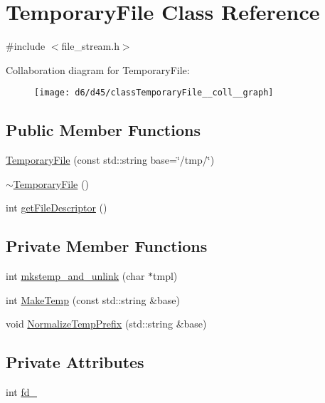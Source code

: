 \hypertarget{classTemporaryFile}{}\section{Temporary\+File Class Reference}
\label{classTemporaryFile}


{\ttfamily \#include $<$file\+\_\+stream.\+h$>$}



Collaboration diagram for Temporary\+File\+:
\nopagebreak
\begin{figure}[H]
\begin{center}
\leavevmode
\texttt{[image: d6/d45/classTemporaryFile\_\_coll\_\_graph]}
\end{center}
\end{figure}
\subsection*{Public Member Functions}
\begin{DoxyCompactItemize}
\item 
\hyperlink{classTemporaryFile_ae277398c5952b6ad8f1884a9a529a5cd}{Temporary\+File} (const std\+::string base=\char`\"{}/tmp/\char`\"{})
\item 
\hyperlink{classTemporaryFile_a7a0f828343c95d3a7e81d6d3587ad116}{$\sim$\+Temporary\+File} ()
\item 
int \hyperlink{classTemporaryFile_a072b404ac82e2fe98d9c78ed93fc4e19}{get\+File\+Descriptor} ()
\end{DoxyCompactItemize}
\subsection*{Private Member Functions}
\begin{DoxyCompactItemize}
\item 
int \hyperlink{classTemporaryFile_a31644f6b89b246deb1ccaa1dbc8f0e40}{mkstemp\+\_\+and\+\_\+unlink} (char $\ast$tmpl)
\item 
int \hyperlink{classTemporaryFile_a29753c39509ccada57e78c7c89141f06}{Make\+Temp} (const std\+::string \&base)
\item 
void \hyperlink{classTemporaryFile_a97edc170c91b8a4b3fe49aab861ad5d4}{Normalize\+Temp\+Prefix} (std\+::string \&base)
\end{DoxyCompactItemize}
\subsection*{Private Attributes}
\begin{DoxyCompactItemize}
\item 
int \hyperlink{classTemporaryFile_a3c914ba5112fa559431c069a0c04f49f}{fd\+\_\+}
\end{DoxyCompactItemize}



